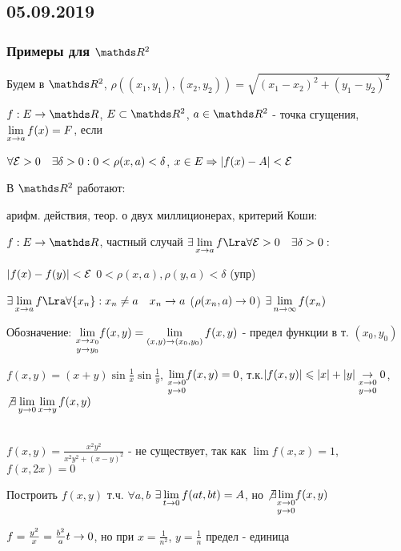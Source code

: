 \documentclass[main]{subfiles}
\begin{document}
  \subsection{05.09.2019}
  \subsubsection{Примеры для $\R^2$}

  Будем в $\R^2$, $\rho((x_1,y_1), (x_2,y_2)) = \sqrt{(x_1-x_2)^2 + (y_1-y_2)^2}$
  \begin{definition}
      $f: E \ra \R$, $E \subset \R^2$, $a \in \R^2$ - точка сгущения, $\lim\limits_{x \rightarrow a} f(x) = F$, если

      $\forall \mathcal{E}>0 \quad \exists \delta>0: 0<\rho(x,a)<\delta$, $x \in E \Rightarrow |f(x)-A|<\mathcal{E}$
  \end{definition}
  В $\R^2$ работают:

  арифм. действия, теор. о двух миллиционерах, критерий Коши:
  \begin{definition}
      $f: E \ra \R$, частный случай $\e \lim\limits_{x \ra a} f \Lra \forall \E>0 \q \e \delta > 0:$

      $|f(x)-f(y)|<\mathcal{E}$ $0<\rho(x,a), \rho(y,a)<\delta$ (упр)
  \end{definition}

  \begin{upr}
      $\e \lim\limits_{x \ra a} f \Lra \forall \{x_n\}: x_n \neq a \q x_n \ra a$ ($\rho(x_n,a) \rightarrow 0$) $\exists \lim\limits_{n \rightarrow \infty} f(x_n)$
  \end{upr}

  Обозначение: $\underset{y \rightarrow y_0}{\lim\limits_{x \rightarrow x_0}} f(x,y) = \lim\limits_{(x,y) \rightarrow (x_0,y_0)} f(x,y)$ - предел функции в т. $(x_0,y_0)$

  \begin{example}
      $f(x,y)=(x+y)\sin \frac{1}{x} \sin \frac{1}{y}$, $\underset{y \rightarrow 0}{\lim\limits_{x \rightarrow 0}} f(x,y) = 0$, т.к.$|f(x,y)| \leqslant |x|+|y| \underset{y \rightarrow 0}{\underset{x \rightarrow 0}{\rightarrow}} 0$, $\not \exists \lim\limits_{y \rightarrow 0} \lim\limits_{x \rightarrow y} f(x,y)$
  \end{example}

  \begin{example}\\
      $f(x,y)=\frac{x^2 y^2}{x^2 y^2 + (x-y)^2}$ - не существует, так как $\lim f(x,x)=1$, $f(x,2x)=0$
  \end{example}

  \begin{example}
      Построить $f(x,y)$ т.ч. $\forall a,b$ $\exists \lim\limits_{t \rightarrow 0} f(at,bt)=A$, но $\not \exists \underset{y \rightarrow 0}{\lim\limits_{x \rightarrow 0}} f(x,y)$

      $f=\frac{y^2}{x}=\frac{b^2}{a} t \rightarrow 0$, но при $x=\frac{1}{n^2}$, $y=\frac{1}{n}$ предел - единица
  \end{example}
\end{document}
